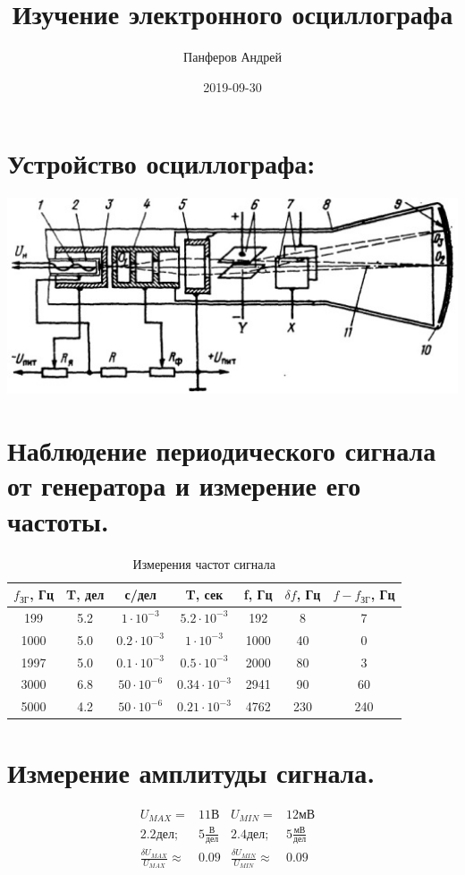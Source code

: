 \documentclass{article}
\title{Изучение электронного осциллографа}
\date{2019-09-30}
\author{Панферов Андрей}
\begin{document}
\topmargin=-10mm
\maketitle
\newpage
{}

\section{Устройство осциллографа:}

\includegraphics[width=1\textwidth]{osci.jpg}


\section{Наблюдение периодического сигнала от генератора и измерение его частоты.}
\begin{table}[h!]
\begin{center}
\caption{Измерения частот сигнала}
\begin{tabular}{|c|c|c|c|c|c|c|}
	\hline
	$f_{ЗГ}$, Гц & T, дел & с/дел & T, сек & f, Гц & $\delta f$, Гц & $f-f_{ЗГ}$, Гц \\
	\hline
	 199 & 5.2 & $1\cdot10^{-3}$ & $5.2\cdot10^{-3}$ & 192 & 8 & 7 \\
	\hline
	 1000 & 5.0 & $0.2\cdot10^{-3}$ & $1\cdot10^{-3}$ & 1000 & 40 & 0 \\
	\hline
	 1997 & 5.0 & $0.1\cdot10^{-3}$ & $0.5\cdot10^{-3}$ & 2000 & 80 & 3 \\
	\hline
	 3000 & 6.8 & $50\cdot10^{-6}$ & $0.34\cdot10^{-3}$ & 2941 & 90 &  60\\
	\hline
	 5000 & 4.2 & $50\cdot10^{-6}$ & $0.21\cdot10^{-3}$ & 4762 & 230 & 240 \\
	\hline
\end{tabular}
\end{center}
\end{table}

\section{Измерение амплитуды сигнала.}
\begin{align*}
U_{MAX} =& 11В&
	U_{MIN} =& 12мВ& \\
2.2дел;\: \: & 5\frac{В}{дел}&
	2.4дел;\: \: & 5\frac{мВ}{дел}& \\
\frac{\delta U_{MAX}}{U_{MAX}} \approx& 0.09& 
	 \frac{\delta U_{MIN}}{U_{MIN}} \approx& 0.09& 
\end{align*}
\end{document}
